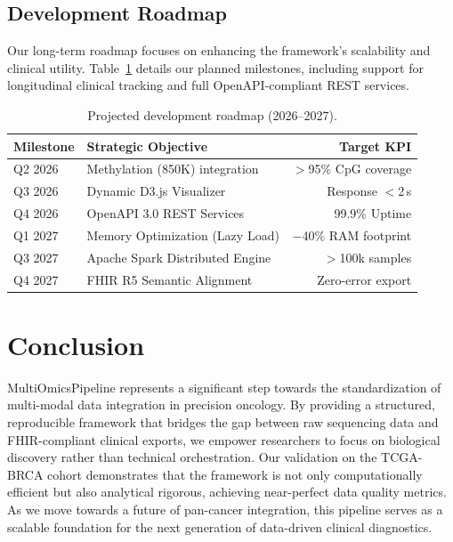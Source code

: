 \documentclass[sigconf,nonacm]{acmart}
\begin{document}
\subsection{Development Roadmap}
Our long-term roadmap focuses on enhancing the framework's scalability and clinical utility. Table~\ref{tab:roadmap} details our planned milestones, including support for longitudinal clinical tracking and full OpenAPI-compliant REST services.

\begin{table}[h]
\caption{Projected development roadmap (2026--2027).}\label{tab:roadmap}
\centering
\small
\renewcommand{\arraystretch}{1.2}
\begin{tabularx}{\columnwidth}{l X r}
\toprule
\rowcolor{headergray} \textbf{Milestone} & \textbf{Strategic Objective} & \textbf{Target KPI} \\
\midrule
Q2 2026 & Methylation (850K) integration    & $>$95\% CpG coverage \\
Q3 2026 & Dynamic D3.js Visualizer          & Response $<$2\,s \\
Q4 2026 & OpenAPI 3.0 REST Services         & 99.9\% Uptime \\
Q1 2027 & Memory Optimization (Lazy Load)   & $-$40\% RAM footprint \\
Q3 2027 & Apache Spark Distributed Engine   & $>$100k samples \\
Q4 2027 & FHIR R5 Semantic Alignment        & Zero-error export \\
\bottomrule
\end{tabularx}
\end{table}

\section{Conclusion}

MultiOmicsPipeline represents a significant step towards the standardization of multi-modal data integration in precision oncology. By providing a structured, reproducible framework that bridges the gap between raw sequencing data and FHIR-compliant clinical exports, we empower researchers to focus on biological discovery rather than technical orchestration. Our validation on the TCGA-BRCA cohort demonstrates that the framework is not only computationally efficient but also analytical rigorous, achieving near-perfect data quality metrics. As we move towards a future of pan-cancer integration, this pipeline serves as a scalable foundation for the next generation of data-driven clinical diagnostics.
\end{document}
